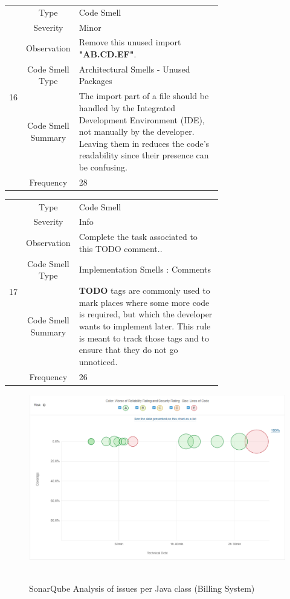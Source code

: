 \documentclass[12pt,letterpaper]{report}
\begin{document}
\begin{table}
    \begin{tabular}{|c|c|p{0.7\linewidth}|}
    \hline   
    \multirow{6}{*}{16}
        & Type & Code Smell \\
    \cline{2-3}
        & Severity & Minor \\
    \cline{2-3}
       & Observation & Remove this unused import \textbf{"AB.CD.EF"}. \\
    \cline{2-3}
       & Code Smell Type & Architectural Smells - Unused Packages   \\
    \cline{2-3}
       & Code Smell Summary &  The import part of a file should be handled by the Integrated Development Environment (IDE), not manually by the developer. Leaving them in reduces the code’s readability since their presence can be confusing. \\
    \cline{2-3}
       & Frequency & 28 \\
    \hline
    \end{tabular}
\end{table}

\begin{table}
    \begin{tabular}{|c|c|p{0.7\linewidth}|}
    \hline   
    \multirow{6}{*}{17}
        & Type & Code Smell \\
    \cline{2-3}
        & Severity & Info \\
    \cline{2-3}
       & Observation & Complete the task associated to this TODO comment.. \\
    \cline{2-3}
       & Code Smell Type & Implementation Smells :  Comments   \\
    \cline{2-3}
       & Code Smell Summary &  \textbf{TODO} tags are commonly used to mark places where some more code is required, but which the developer wants to implement later. This rule is meant to track those tags and to ensure that they do not go unnoticed. \\
    \cline{2-3}
       & Frequency & 26 \\
    \hline
    \end{tabular}
\end{table}

\begin{figure}
    \centering
    \includegraphics[width=0.7\linewidth]{Images/Debt_per_class.png}\
    \caption{SonarQube Analysis of issues per Java class (Billing System)}
    \label{fig:enter-label}
\end{figure}
\end{document}
